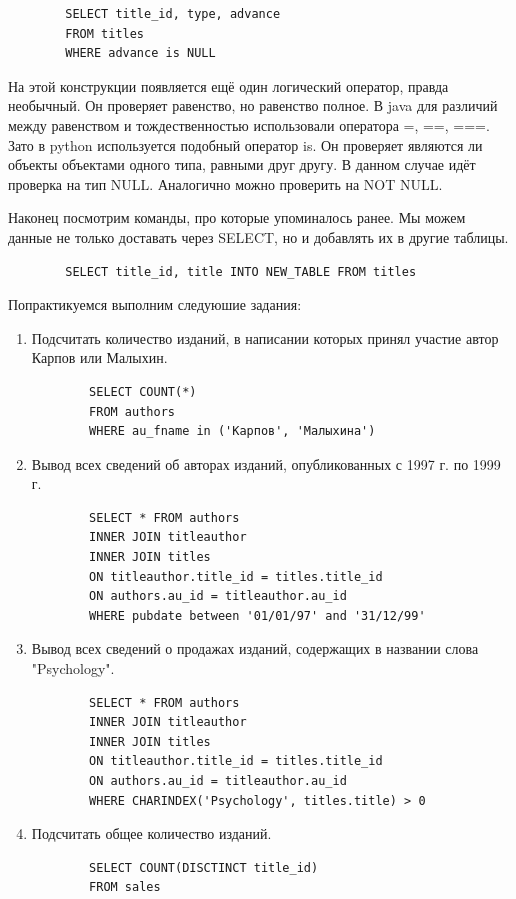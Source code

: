 \begin{verbatim}
        SELECT title_id, type, advance
        FROM titles
        WHERE advance is NULL
\end{verbatim}

На этой конструкции появляется ещё один логический оператор, правда необычный. Он проверяет равенство, но равенство полное. В java для различий между равенством и тождественностью использовали оператора =, ==, ===. Зато в python используется подобный оператор is. Он проверяет являются ли объекты объектами одного типа, равными друг другу. В данном случае идёт проверка на тип NULL. Аналогично можно проверить на NOT NULL.

Наконец посмотрим команды, про которые упоминалось ранее. Мы можем данные не только доставать через SELECT, но и добавлять их в другие таблицы.

\begin{verbatim}
        SELECT title_id, title INTO NEW_TABLE FROM titles
\end{verbatim}

Попрактикуемся выполним следуюшие задания:
\begin{enumerate}
    \item Подсчитать количество изданий, в написании которых принял участие автор Карпов или Малыхин.
\begin{verbatim}
        SELECT COUNT(*)
        FROM authors
        WHERE au_fname in ('Карпов', 'Малыхина')

\end{verbatim}
    \item Вывод всех сведений об авторах изданий, опубликованных с 1997 г. по 1999 г.
\begin{verbatim}
        SELECT * FROM authors 
        INNER JOIN titleauthor
        INNER JOIN titles
        ON titleauthor.title_id = titles.title_id
        ON authors.au_id = titleauthor.au_id
        WHERE pubdate between '01/01/97' and '31/12/99'
\end{verbatim}
    \item Вывод всех сведений о продажах изданий, содержащих в названии слова "Psychology".
\begin{verbatim}
        SELECT * FROM authors 
        INNER JOIN titleauthor
        INNER JOIN titles
        ON titleauthor.title_id = titles.title_id
        ON authors.au_id = titleauthor.au_id
        WHERE CHARINDEX('Psychology', titles.title) > 0
\end{verbatim}
    \item Подсчитать общее количество изданий.
\begin{verbatim}
        SELECT COUNT(DISCTINCT title_id)
        FROM sales
\end{verbatim}
\end{enumerate}
